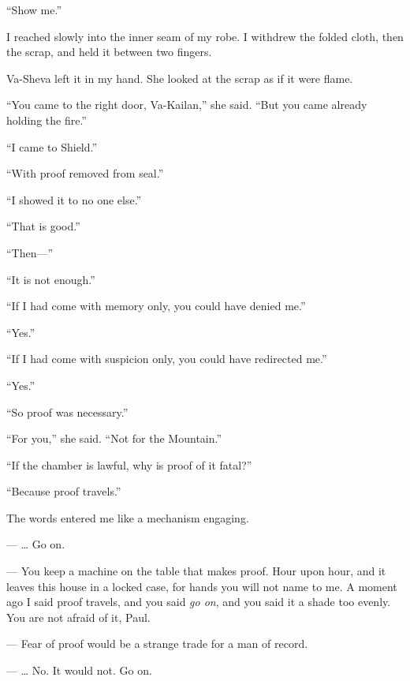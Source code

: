 ``Show me.''\par

I reached slowly into the inner seam of my robe. I withdrew the folded cloth, then the scrap, and held it between two fingers.\par

Va-Sheva left it in my hand. She looked at the scrap as if it were flame.\par

``You came to the right door, Va-Kailan,'' she said. ``But you came already holding the fire.''\par

``I came to Shield.''\par

``With proof removed from seal.''\par

``I showed it to no one else.''\par

``That is good.''\par

``Then---''\par

``It is not enough.''\par

``If I had come with memory only, you could have denied me.''\par

``Yes.''\par

``If I had come with suspicion only, you could have redirected me.''\par

``Yes.''\par

``So proof was necessary.''\par

``For you,'' she said. ``Not for the Mountain.''\par

``If the chamber is lawful, why is proof of it fatal?''\par

``Because proof travels.''\par

The words entered me like a mechanism engaging.\par

\ornament

\begin{room}

--- \ldots{} Go on.

--- You keep a machine on the table that makes proof. Hour upon hour, and it leaves this house in a locked case, for hands you will not name to me. A moment ago I said proof travels, and you said \emph{go on}, and you said it a shade too evenly. You are not afraid of it, Paul.

--- Fear of proof would be a strange trade for a man of record.

--- \ldots{} No. It would not. Go on.

\end{room}

